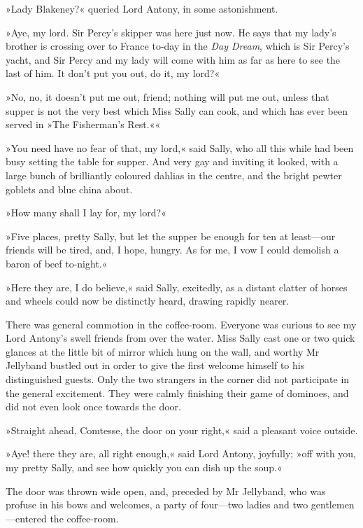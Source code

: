 »Lady Blakeney?« queried Lord Antony, in some astonishment.

»Aye, my lord. Sir Percy's skipper was here just now. He says that my lady's brother is crossing over to France to-day in the \textit{Day Dream}, which is Sir Percy's yacht, and Sir Percy and my lady will come with him as far as here to see the last of him. It don't put you out, do it, my lord?«

»No, no, it doesn't put me out, friend; nothing will put me out, unless that supper is not the very best which Miss Sally can cook, and which has ever been served in »The Fisherman's Rest.««

»You need have no fear of that, my lord,« said Sally, who all this while had been busy setting the table for supper. And very gay and inviting it looked, with a large bunch of brilliantly coloured dahlias in the centre, and the bright pewter goblets and blue china about.

»How many shall I lay for, my lord?«

»Five places, pretty Sally, but let the supper be enough for ten at least\allowbreak---\allowbreak our friends will be tired, and, I hope, hungry. As for me, I vow I could demolish a baron of beef to-night.«

»Here they are, I do believe,« said Sally, excitedly, as a distant clatter of horses and wheels could now be distinctly heard, drawing rapidly nearer.

There was general commotion in the coffee-room. Everyone was curious to see my Lord Antony's swell friends from over the water. Miss Sally cast one or two quick glances at the little bit of mirror which hung on the wall, and worthy Mr Jellyband bustled out in order to give the first welcome himself to his distinguished guests. Only the two strangers in the corner did not participate in the general excitement. They were calmly finishing their game of dominoes, and did not even look once towards the door.

»Straight ahead, Comtesse, the door on your right,« said a pleasant voice outside.

»Aye! there they are, all right enough,« said Lord Antony, joyfully; »off with you, my pretty Sally, and see how quickly you can dish up the soup.«

The door was thrown wide open, and, preceded by Mr Jellyband, who was profuse in his bows and welcomes, a party of four\allowbreak---\allowbreak two ladies and two gentlemen\allowbreak---\allowbreak entered the coffee-room.

